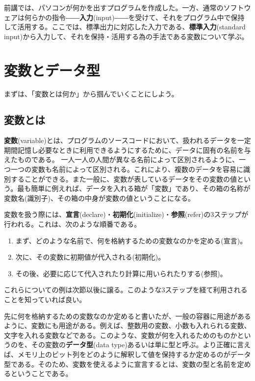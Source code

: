 前講では、パソコンが何かを出すプログラムを作成した。一方、通常のソフトウェアは何らかの指令――\textbf{入力}(input)――を受けて、それをプログラム中で保持して活用する。ここでは、標準出力に対応した入力である、\textbf{標準入力}(standard input)から入力して、それを保持・活用する為の手法である変数について学ぶ。

\section{変数とデータ型}
まずは、「変数とは何か」から掴んでいくことにしよう。
\subsection{変数とは}
\textbf{変数}(variable)とは、プログラムのソースコードにおいて、扱われるデータを一定期間記憶し必要なときに利用できるようにするために、データに固有の名前を与えたものである。 一人一人の人間が異なる名前によって区別されるように、一つ一つの変数も名前によって区別される。これにより、複数のデータを容易に識別することができる。また一般に、変数が表しているデータをその変数の値という。最も簡単に例えれば、データを入れる箱が「変数」であり、その箱の名称が変数名(識別子)、その箱の中身が変数の値ということになる。

変数を扱う際には、\textbf{宣言}(declare)・\textbf{初期化}(initialize)・\textbf{参照}(refer)の3ステップが行われる。これは、次のような順番である。
\begin{enumerate}
\item まず、どのような名前で、何を格納するための変数なのかを定める(宣言)。
\item 次に、その変数に初期値が代入される(初期化)。
\item その後、必要に応じて代入されたり計算に用いられたりする(参照)。
\end{enumerate}
これらについての例は次節以後に譲る。このような3ステップを経て利用されることを知っていれば良い。

先に何を格納するための変数なのか定めると書いたが、一般の容器に用途があるように、変数にも用途がある。例えば、整数用の変数、小数も入れられる変数、文字を入れる変数などである。このような、変数が何を入れるためのものかというのを、その変数の\textbf{データ型}(data type)あるいは単に型と呼ぶ。より正確に言えば、メモリ上のビット列をどのように解釈して値を保持するか定めるのがデータ型である。そのため、変数を使えるように宣言するとは、変数の型と名前を定めるということである。

